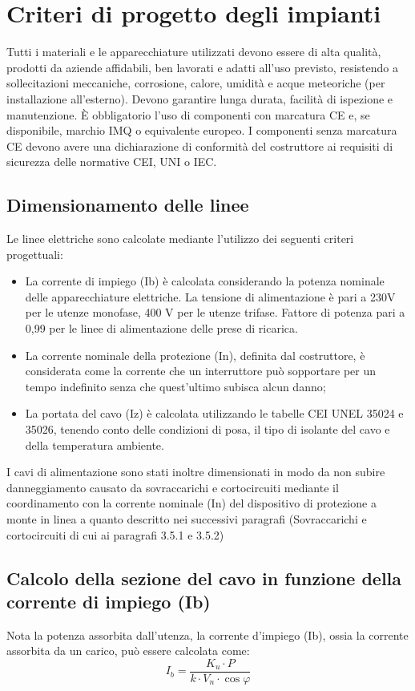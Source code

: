 \newpage
\pagestyle{fancy}

\section{Criteri di progetto degli impianti}
Tutti i materiali e le apparecchiature utilizzati devono essere di alta qualità, prodotti da aziende affidabili, ben lavorati e adatti all'uso previsto, resistendo a sollecitazioni meccaniche, corrosione, calore, umidità e acque meteoriche (per installazione all’esterno). Devono garantire lunga durata, facilità di ispezione e manutenzione. 
È obbligatorio l'uso di componenti con marcatura CE e, se disponibile, marchio IMQ o equivalente europeo. I componenti senza marcatura CE devono avere una dichiarazione di conformità del costruttore ai requisiti di sicurezza delle normative CEI, UNI o IEC.

\subsection{Dimensionamento delle linee}
Le linee elettriche sono calcolate mediante l’utilizzo dei seguenti criteri progettuali:
\begin{itemize}
    \item La corrente di impiego (Ib) è calcolata considerando la potenza nominale delle apparecchiature elettriche. La tensione di alimentazione è pari a 230V per le utenze monofase, 400 V per le utenze trifase. Fattore di potenza pari a 0,99 per le linee di alimentazione delle prese di ricarica.
    \item La corrente nominale della protezione (In), definita dal costruttore, è considerata come la corrente che un interruttore può sopportare per un tempo indefinito senza che quest’ultimo subisca alcun danno;
    \item La portata del cavo (Iz) è calcolata utilizzando le tabelle CEI UNEL 35024 e 35026, tenendo conto delle condizioni di posa, il tipo di isolante del cavo e della temperatura ambiente.
\end{itemize}
I cavi di alimentazione sono stati inoltre dimensionati in modo da non subire danneggiamento causato da sovraccarichi e cortocircuiti mediante il coordinamento con la corrente nominale (In) del dispositivo di protezione a monte in linea a quanto descritto nei successivi paragrafi (Sovraccarichi e cortocircuiti di cui ai paragrafi 3.5.1 e 3.5.2)


\subsection{Calcolo della sezione del cavo in funzione della corrente di impiego (Ib)}
Nota la potenza assorbita dall’utenza, la corrente d’impiego (Ib), ossia la corrente assorbita da un carico, può essere calcolata come: 
\[ I_b = \frac{K_u \cdot P}{k \cdot V_n \cdot \cos\varphi} \]


